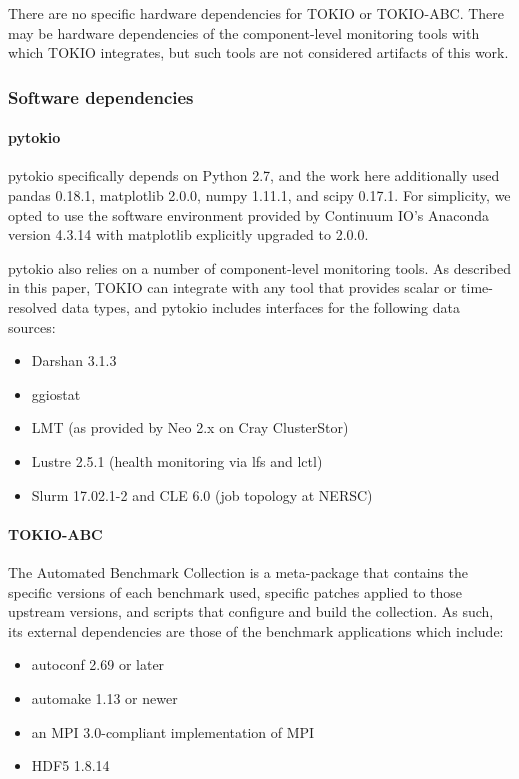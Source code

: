 There are no specific hardware dependencies for TOKIO or TOKIO-ABC.
There may be hardware dependencies of the component-level monitoring tools with which TOKIO integrates, but such tools are not considered artifacts of this work.

\subsubsection{Software dependencies}

\paragraph{pytokio}

pytokio specifically depends on Python 2.7, and the work here additionally used pandas 0.18.1, matplotlib 2.0.0, numpy 1.11.1, and scipy 0.17.1.
For simplicity, we opted to use the software environment provided by Continuum IO's Anaconda version 4.3.14 with matplotlib explicitly upgraded to 2.0.0.

pytokio also relies on a number of component-level monitoring tools.
As described in this paper, TOKIO can integrate with any tool that provides scalar or time-resolved data types, and pytokio includes interfaces for the following data sources:

\begin{itemize}
\item Darshan 3.1.3 %
\item ggiostat
\item LMT (as provided by Neo 2.x on Cray ClusterStor) %
\item Lustre 2.5.1 (health monitoring via lfs and lctl)
\item Slurm 17.02.1-2 and CLE 6.0 (job topology at NERSC)
\end{itemize}

\paragraph{TOKIO-ABC} The Automated Benchmark Collection is a meta-package that contains the specific versions of each benchmark used, specific patches applied to those upstream versions, and scripts that configure and build the collection.
As such, its external dependencies are those of the benchmark applications which include:

\begin{itemize}
\item autoconf 2.69 or later
\item automake 1.13 or newer
\item an MPI 3.0-compliant implementation of MPI
\item HDF5 1.8.14
\end{itemize}

